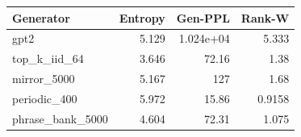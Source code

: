\begin{tabular}{lrrr}
\toprule
Generator & Entropy & Gen-PPL & Rank-W \\
\midrule
gpt2 & 5.129 & 1.024e+04 & 5.333 \\
top\_k\_iid\_64 & 3.646 & 72.16 & 1.38 \\
mirror\_5000 & 5.167 & 127 & 1.68 \\
periodic\_400 & 5.972 & 15.86 & 0.9158 \\
phrase\_bank\_5000 & 4.604 & 72.31 & 1.075 \\
\bottomrule
\end{tabular}
